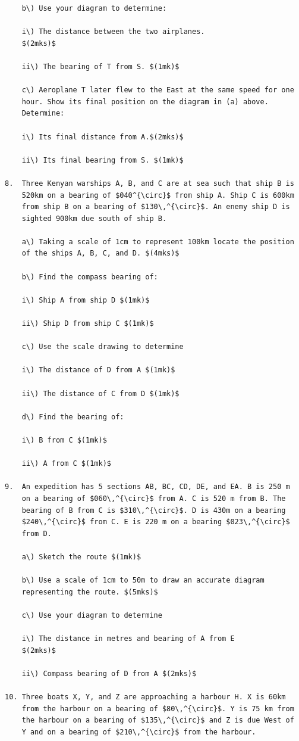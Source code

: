 \documentclass[
  a4paperpaper,
]{scrbook}
\begin{document}
\begin{tcolorbox}
\begin{verbatim}
    b\) Use your diagram to determine:

    i\) The distance between the two airplanes.
    $(2mks)$

    ii\) The bearing of T from S. $(1mk)$

    c\) Aeroplane T later flew to the East at the same speed for one
    hour. Show its final position on the diagram in (a) above.
    Determine:

    i\) Its final distance from A.$(2mks)$

    ii\) Its final bearing from S. $(1mk)$

8.  Three Kenyan warships A, B, and C are at sea such that ship B is
    520km on a bearing of $040^{\circ}$ from ship A. Ship C is 600km
    from ship B on a bearing of $130\,^{\circ}$. An enemy ship D is
    sighted 900km due south of ship B.

    a\) Taking a scale of 1cm to represent 100km locate the position
    of the ships A, B, C, and D. $(4mks)$

    b\) Find the compass bearing of:

    i\) Ship A from ship D $(1mk)$

    ii\) Ship D from ship C $(1mk)$

    c\) Use the scale drawing to determine

    i\) The distance of D from A $(1mk)$

    ii\) The distance of C from D $(1mk)$

    d\) Find the bearing of:

    i\) B from C $(1mk)$

    ii\) A from C $(1mk)$

9.  An expedition has 5 sections AB, BC, CD, DE, and EA. B is 250 m
    on a bearing of $060\,^{\circ}$ from A. C is 520 m from B. The
    bearing of B from C is $310\,^{\circ}$. D is 430m on a bearing
    $240\,^{\circ}$ from C. E is 220 m on a bearing $023\,^{\circ}$
    from D.

    a\) Sketch the route $(1mk)$

    b\) Use a scale of 1cm to 50m to draw an accurate diagram
    representing the route. $(5mks)$

    c\) Use your diagram to determine

    i\) The distance in metres and bearing of A from E
    $(2mks)$

    ii\) Compass bearing of D from A $(2mks)$

10. Three boats X, Y, and Z are approaching a harbour H. X is 60km
    from the harbour on a bearing of $80\,^{\circ}$. Y is 75 km from
    the harbour on a bearing of $135\,^{\circ}$ and Z is due West of
    Y and on a bearing of $210\,^{\circ}$ from the harbour.


\end{verbatim}
\end{tcolorbox}
\end{document}
